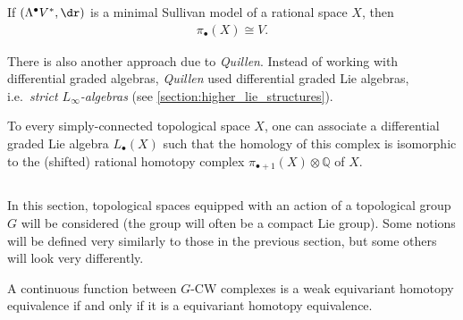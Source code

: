    \begin{property}
        If $(\Lambda^\bullet V^*,\dr)$ is a minimal Sullivan model of a rational space $X$, then
        \begin{gather}
            \pi_\bullet(X)\cong V.
        \end{gather}
    \end{property}

    There is also another approach due to \textit{Quillen}. Instead of working with differential graded algebras, \textit{Quillen} used differential graded Lie algebras, i.e.~\textit{strict $L_\infty$-algebras} (see \cref{section:higher_lie_structures}).
    \begin{construct}
        To every simply-connected topological space $X$, one can associate a differential graded Lie algebra $L_\bullet(X)$ such that the homology of this complex is isomorphic to the (shifted) rational homotopy complex $\pi_{\bullet+1}(X)\otimes\mathbb{Q}$ of $X$.
    \end{construct}

\subsection{}

    In this section, topological spaces equipped with an action of a topological group $G$ will be considered (the group will often be a compact Lie group). Some notions will be defined very similarly to those in the previous section, but some others will look very differently.



    \begin{theorem}
        A continuous function between $G$-CW complexes is a weak equivariant homotopy equivalence if and only if it is a equivariant homotopy equivalence.
    \end{theorem}


